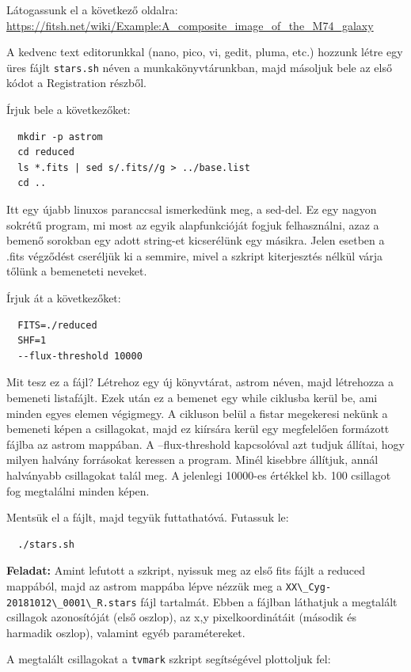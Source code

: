 \documentclass{article}
\begin{document}
Látogassunk el a következő oldalra:
\url{https://fitsh.net/wiki/Example:A_composite_image_of_the_M74_galaxy}

A kedvenc text editorunkkal (nano, pico, vi, gedit, pluma, etc.) hozzunk létre
egy üres fájlt \verb+stars.sh+ néven a munkakönyvtárunkban, majd másoljuk bele az első
kódot a Registration részből.

Írjuk bele a következőket:
\begin{verbatim}
  mkdir -p astrom
  cd reduced
  ls *.fits | sed s/.fits//g > ../base.list
  cd ..
\end{verbatim}

Itt egy újabb linuxos paranccsal ismerkedünk meg, a sed-del. Ez egy nagyon
sokrétű program, mi most az egyik alapfunkcióját fogjuk felhasználni, azaz a
bemenő sorokban egy adott string-et kicserélünk egy másikra. Jelen esetben a
.fits végződést cseréljük ki a semmire, mivel a szkript kiterjesztés nélkül
várja tőlünk a bemeneteti neveket.

Írjuk át a következőket:
\begin{verbatim}
  FITS=./reduced
  SHF=1
  --flux-threshold 10000
\end{verbatim}

Mit tesz ez a fájl? Létrehoz egy új könyvtárat, astrom néven, majd létrehozza a
bemeneti listafájlt. Ezek után ez a bemenet egy while ciklusba kerül be, ami
minden egyes elemen végigmegy. A cikluson belül a fistar megekeresi nekünk a
bemeneti képen a csillagokat, majd ez kiírsára kerül egy megfelelően formázott
fájlba az astrom mappában.
A --flux-threshold kapcsolóval azt tudjuk állítai, hogy milyen halvány
forrásokat keressen a program. Minél kisebbre  állítjuk, annál halványabb
csillagokat talál meg. A jelenlegi 10000-es értékkel kb. 100 csillagot fog
megtalálni minden képen.

Mentsük el a fájlt, majd tegyük futtathatóvá. Futassuk le:

\begin{verbatim}
  ./stars.sh
\end{verbatim}

{\bf Feladat:}
Amint lefutott a szkript, nyissuk meg az első fits fájlt a reduced mappából,
majd az astrom mappába lépve nézzük meg a \verb+XX\_Cyg-20181012\_0001\_R.stars+ fájl
tartalmát. Ebben a fájlban láthatjuk a megtalált csillagok azonosítóját (első
oszlop), az x,y pixelkoordinátáit (második és harmadik oszlop), valamint
egyéb paramétereket.

A megtalált csillagokat a \verb+tvmark+ szkript segítségével plottoljuk fel:
\end{document}
